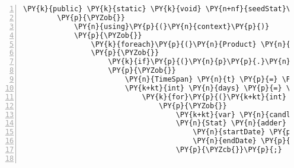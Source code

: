 \begin{Verbatim}[commandchars=\\\{\},numbers=left,firstnumber=1,stepnumber=1,numberblanklines=0]
        \PY{k}{public} \PY{k}{static} \PY{k}{void} \PY{n+nf}{seedStat}\PY{p}{(}\PY{k+kt}{int} \PY{n}{exchangeID}\PY{p}{,} \PY{n}{DateTime} \PY{n}{startDate}\PY{p}{,} \PY{n}{DateTime} \PY{n}{endDate}\PY{p}{,} \PY{n}{CryptoContext} \PY{n}{context}\PY{p}{)}
        \PY{p}{\PYZob{}}
            \PY{n}{using}\PY{p}{(}\PY{n}{context}\PY{p}{)}
            \PY{p}{\PYZob{}}
                \PY{k}{foreach}\PY{p}{(}\PY{n}{Product} \PY{n}{p} \PY{k}{in} \PY{n}{client}\PY{p}{.}\PY{n}{ProductsService}\PY{p}{.}\PY{n}{GetAllProductsAsync}\PY{p}{(}\PY{p}{)}\PY{p}{.}\PY{n}{Result}\PY{p}{)}
                \PY{p}{\PYZob{}}
                    \PY{k}{if}\PY{p}{(}\PY{n}{p}\PY{p}{.}\PY{n}{Id}\PY{p}{.}\PY{n}{ToString}\PY{p}{(}\PY{p}{)}\PY{p}{.}\PY{n}{Equals}\PY{p}{(}\PY{n}{context}\PY{p}{.}\PY{n}{Exchanges}\PY{p}{.}\PY{n}{Find}\PY{p}{(}\PY{n}{exchangeID}\PY{p}{)}\PY{p}{.}\PY{n}{Name}\PY{p}{)}\PY{p}{)}
                    \PY{p}{\PYZob{}}
                        \PY{n}{TimeSpan} \PY{n}{t} \PY{p}{=} \PY{n}{endDate}\PY{p}{.}\PY{n}{Subtract}\PY{p}{(}\PY{n}{startDate}\PY{p}{)}\PY{p}{;}
                        \PY{k+kt}{int} \PY{n}{days} \PY{p}{=} \PY{p}{(}\PY{k+kt}{int}\PY{p}{)}\PY{n}{t}\PY{p}{.}\PY{n}{TotalDays}\PY{p}{;}
                            \PY{k}{for}\PY{p}{(}\PY{k+kt}{int} \PY{n}{i} \PY{p}{=} \PY{l+m}{0}\PY{p}{;} \PY{n}{i} \PY{p}{\PYZlt{}} \PY{n}{days}\PY{p}{;} \PY{n}{i}\PY{p}{+}\PY{p}{+}\PY{p}{)}
                                \PY{p}{\PYZob{}}
                                    \PY{k+kt}{var} \PY{n}{candles} \PY{p}{=} \PY{n}{client}\PY{p}{.}\PY{n}{ProductsService}\PY{p}{.}\PY{n}{GetHistoricRatesAsync}\PY{p}{(}\PY{n}{p}\PY{p}{.}\PY{n}{Id}\PY{p}{,} \PY{n}{startDate}\PY{p}{,} \PY{n}{endDate}\PY{p}{,} \PY{n}{CandleGranularity}\PY{p}{.}\PY{n}{Minutes1}\PY{p}{)}\PY{p}{.}\PY{n}{Result}\PY{p}{;}
                                    \PY{n}{Stat} \PY{n}{adder} \PY{p}{=} \PY{k}{new} \PY{n}{Stat}\PY{p}{(}\PY{p}{)}\PY{p}{\PYZob{}}
                                        \PY{n}{startDate} \PY{p}{=} \PY{n}{candles}\PY{p}{.}\PY{n}{First}\PY{p}{(}\PY{p}{)}\PY{p}{.}\PY{n}{Time}\PY{p}{,}
                                        \PY{n}{endDate} \PY{p}{=} \PY{n}{candles}\PY{p}{.}\PY{n}{Last}\PY{p}{(}\PY{p}{)}\PY{p}{.}\PY{n}{Time}  
                                    \PY{p}{\PYZcb{}}\PY{p}{;}


\end{Verbatim}
